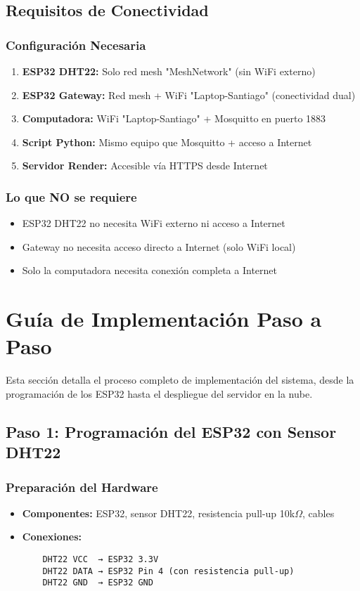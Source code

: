 \documentclass[12pt]{article}
\begin{document}
\subsection{Requisitos de Conectividad}

\subsubsection{Configuración Necesaria}
\begin{enumerate}
    \item \textbf{ESP32 DHT22:} Solo red mesh "MeshNetwork" (sin WiFi externo)
    \item \textbf{ESP32 Gateway:} Red mesh + WiFi "Laptop-Santiago" (conectividad dual)
    \item \textbf{Computadora:} WiFi "Laptop-Santiago" + Mosquitto en puerto 1883
    \item \textbf{Script Python:} Mismo equipo que Mosquitto + acceso a Internet
    \item \textbf{Servidor Render:} Accesible vía HTTPS desde Internet
\end{enumerate}

\subsubsection{Lo que NO se requiere}
\begin{itemize}
    \item ESP32 DHT22 no necesita WiFi externo ni acceso a Internet
    \item Gateway no necesita acceso directo a Internet (solo WiFi local)
    \item Solo la computadora necesita conexión completa a Internet
\end{itemize}

\section{Guía de Implementación Paso a Paso}

Esta sección detalla el proceso completo de implementación del sistema, desde la programación de los ESP32 hasta el despliegue del servidor en la nube.

\subsection{Paso 1: Programación del ESP32 con Sensor DHT22}

\subsubsection{Preparación del Hardware}
\begin{itemize}
    \item \textbf{Componentes:} ESP32, sensor DHT22, resistencia pull-up 10k$\Omega$, cables
    \item \textbf{Conexiones:}
    \begin{verbatim}
    DHT22 VCC  → ESP32 3.3V
    DHT22 DATA → ESP32 Pin 4 (con resistencia pull-up)
    DHT22 GND  → ESP32 GND
    \end{verbatim}
\end{itemize}
\end{document}
